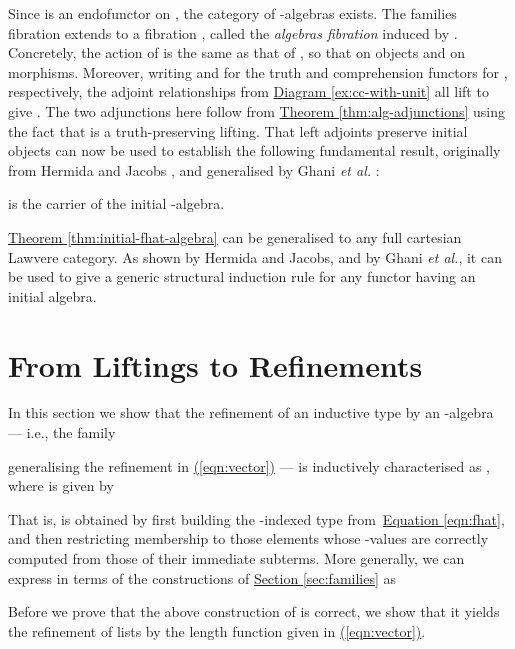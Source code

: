 \documentclass{LMCS}
\newcommand{\parenref}[1]{\hyperref[#1]{(\ref*{#1})}}
\newcommand{\thmref}[1]{\hyperref[#1]{Theorem \ref*{#1}}}
\begin{document}
Since  is an endofunctor on , the category
 of -algebras exists. The families fibration
 extends to a fibration , called the {\em algebras fibration}
induced by . Concretely, the action of  is the same as that
of , so that  on
objects and  on morphisms.  Moreover, writing  and
 for the truth and comprehension functors for ,
respectively, the adjoint relationships from
\hyperref[ex:cc-with-unit]{Diagram \ref*{ex:cc-with-unit}} all lift to
give .  The two
adjunctions here follow from \thmref{thm:alg-adjunctions} using the
fact that  is a truth-preserving lifting. That left adjoints
preserve initial objects can now be used to establish the following
fundamental result, originally from Hermida and Jacobs
\cite{hermida98structural}, and generalised by Ghani \emph{et al.}
\cite{ghani10induction}:
\begin{thm}\label{thm:initial-fhat-algebra}
   is the carrier  of the initial
  -algebra.
\end{thm}
\noindent
\thmref{thm:initial-fhat-algebra} can be generalised to any full
cartesian Lawvere category.  As shown by Hermida and Jacobs, and by
Ghani \emph{et al.}, it can be used to give a generic structural
induction rule for any functor  having an initial algebra.

\section{From Liftings to Refinements}\label{sec:refining-inductive}

In this section we show that the refinement of an
inductive type  by an -algebra  --- i.e.,
the family

generalising the refinement in \parenref{eqn:vector} --- is
inductively characterised as , where  is given by

\noindent
That is,  is obtained by first building the
-indexed type  from~\hyperref[eqn:fhat]{Equation
  \ref*{eqn:fhat}}, and then restricting membership to those elements
whose -values are correctly computed from those of their
immediate subterms. More generally, we can express  in terms
of the constructions of \hyperref[sec:families]{Section
  \ref*{sec:families}} as 


Before we prove that the above construction of  is correct,
we show that it yields the refinement of lists by the length function
given in \parenref{eqn:vector}.
\end{document}
